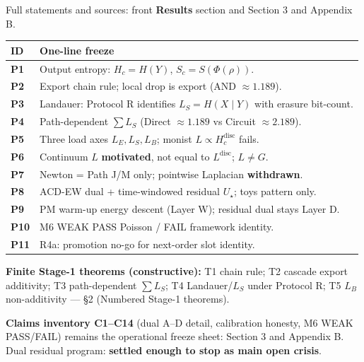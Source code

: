 \documentclass[
  11pt,
]{article}
\newcounter{none} %
\begin{document}
Full statements and sources: front \textbf{Results} section and Section
3 and Appendix B.

{\def\LTcaptype{none} %
\begin{longtable}[]{@{}
  >{\raggedright\arraybackslash}p{}
  >{\raggedright\arraybackslash}p{}@{}}
\toprule\noalign{}
\begin{minipage}[b]{\linewidth}\raggedright
ID
\end{minipage} & \begin{minipage}[b]{\linewidth}\raggedright
One-line freeze
\end{minipage} \\
\midrule\noalign{}
\endhead
\bottomrule\noalign{}
\endlastfoot
\textbf{P1} & Output entropy: \(H_c=H(Y)\), \(S_c=S(\Phi(\rho))\). \\
\textbf{P2} & Export chain rule; local drop is export (AND
\(\approx 1.189\)). \\
\textbf{P3} & Landauer: Protocol R identifies \(L_S=H(X\mid Y)\) with
erasure bit-count. \\
\textbf{P4} & Path-dependent \(\sum L_S\) (Direct \(\approx 1.189\) vs
Circuit \(\approx 2.189\)). \\
\textbf{P5} & Three load axes \(L_E,L_S,L_B\); monist
\(L\propto H_c^{\mathrm{disc}}\) fails. \\
\textbf{P6} & Continuum \(L\) \textbf{motivated}, not equal to
\(L^{\mathrm{disc}}\); \(L\neq G\). \\
\textbf{P7} & Newton = Path J/M only; pointwise Laplacian
\textbf{withdrawn}. \\
\textbf{P8} & ACD-EW dual + time-windowed residual \(U_\star\); toys
pattern only. \\
\textbf{P9} & PM warm-up energy descent (Layer W); residual dual stays
Layer D. \\
\textbf{P10} & M6 WEAK PASS Poisson / FAIL framework identity. \\
\textbf{P11} & R4a: promotion no-go for next-order slot identity. \\
\end{longtable}
}

\textbf{Finite Stage-1 theorems (constructive):} T1 chain rule; T2
cascade export additivity; T3 path-dependent \(\sum L_S\); T4
Landauer/\(L_S\) under Protocol R; T5 \(L_B\) non-additivity --- §2
(Numbered Stage-1 theorems).

\textbf{Claims inventory C1--C14} (dual A--D detail, calibration
honesty, M6 WEAK PASS/FAIL) remains the operational freeze sheet:
Section 3 and Appendix B. Dual residual program: \textbf{settled enough
to stop as main open crisis}.
\end{document}

